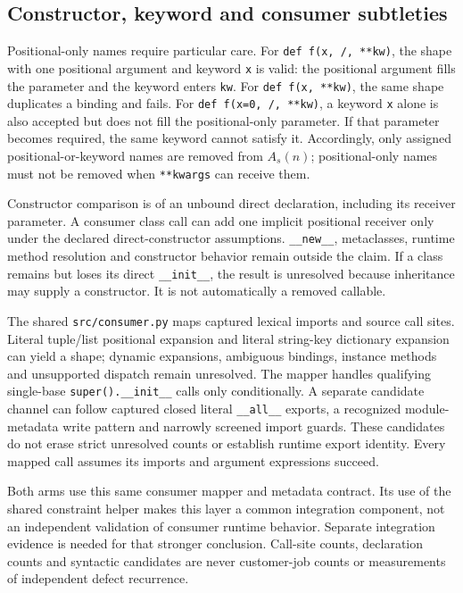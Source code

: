 \documentclass[11pt,letterpaper]{article}
\begin{document}
\subsection{Constructor, keyword and consumer subtleties}

Positional-only names require particular care. For
\texttt{def f(x, /, **kw)}, the shape with one positional argument and keyword
\texttt{x} is valid: the positional argument fills the parameter and the
keyword enters \texttt{kw}. For
\texttt{def f(x, **kw)}, the same shape duplicates a binding and fails.
For \texttt{def f(x=0, /, **kw)}, a keyword \texttt{x} alone is also accepted
but does not fill the positional-only parameter. If that parameter becomes
required, the same keyword cannot satisfy it. Accordingly, only assigned
positional-or-keyword names are removed from $A_s(n)$; positional-only names
must not be removed when \texttt{**kwargs} can receive them.

Constructor comparison is of an unbound direct declaration, including its
receiver parameter. A consumer class call can add one implicit positional
receiver only under the declared direct-constructor assumptions.
\texttt{\_\_new\_\_}, metaclasses, runtime method resolution and constructor
behavior remain outside the claim. If a class remains but loses its direct
\texttt{\_\_init\_\_}, the result is unresolved because inheritance may
supply a constructor. It is not automatically a removed callable.

The shared \texttt{src/consumer.py} maps captured lexical imports and source
call sites. Literal tuple/list positional expansion and literal string-key
dictionary expansion can yield a shape; dynamic expansions, ambiguous
bindings, instance methods and unsupported dispatch remain unresolved.
The mapper handles qualifying single-base \texttt{super().\_\_init\_\_}
calls only conditionally. A separate candidate channel can follow captured
closed literal \texttt{\_\_all\_\_} exports, a recognized module-metadata
write pattern and narrowly screened import guards. These candidates do not
erase strict unresolved counts or establish runtime export identity.
Every mapped call assumes its imports and argument expressions succeed.

Both arms use this same consumer mapper and metadata contract. Its use of
the shared constraint helper makes this layer a common integration
component, not an independent validation of consumer runtime behavior.
Separate integration evidence is needed for that stronger conclusion.
Call-site counts, declaration counts and syntactic candidates are never
customer-job counts or measurements of independent defect recurrence.
\end{document}
